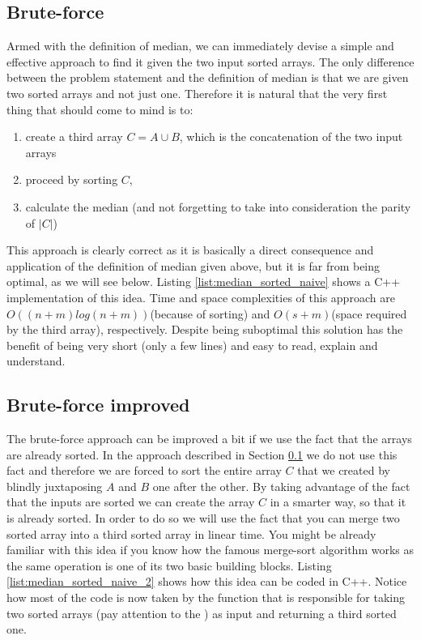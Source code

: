 \subsection{Brute-force}
\label{median_sorted_arrays:sec:bruteforce}
Armed with the definition of median, we can immediately devise a simple and effective approach to
find it given the two input sorted arrays. The only difference between the problem statement and the
definition of median is that we are given two sorted arrays and not just one. Therefore it is
natural that the very first thing that should come to mind is to:
\begin{enumerate}
	\item create a third array $C = A \cup B$, which is the concatenation of the two input arrays
	\item proceed by sorting $C$,
	\item calculate the median (and not forgetting to take into consideration the parity of $|C|$)
\end{enumerate}

This approach is clearly correct as it is basically a direct consequence and application of the
definition of median given above, but it is far from being optimal, as we will see below. Listing
\ref{list:median_sorted_naive} shows a C++ implementation of this idea. Time and space complexities
of this approach are $O((n+m)log(n+m))$(because of sorting) and $O(s+m)$(space required by the third
array), respectively. Despite being suboptimal this solution has the benefit of being very short (only a few lines)
and easy to read, explain and understand.




\subsection{Brute-force improved}
\label{median_sorted_arrays:sec:bruteforce_improved}
The brute-force approach can be improved a bit if we use the fact that the arrays are already
sorted. In the approach described in Section \ref{median_sorted_arrays:sec:bruteforce} we do not use
this fact and therefore we are forced to sort the entire array $C$ that we created by blindly juxtaposing $A$ and $B$ one after the other.
By taking advantage of the fact that the inputs are sorted we can create the array $C$ in a smarter way,
so that it is already sorted. In order to do so we will use the fact that you can merge two sorted array into a third sorted array in linear time.
You might be already familiar with this idea if you know how the famous merge-sort algorithm\cite{wiki:mergesort} works as the same operation is one of its two basic building blocks.
Listing \ref{list:median_sorted_naive_2} shows how this idea can be coded in C++. Notice how most of the code is now taken by the  function that 
is responsible for taking two sorted arrays (pay attention to the ) as input and returning a third sorted one. 

